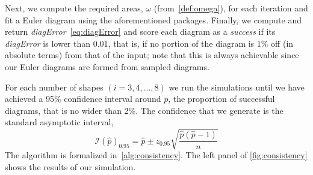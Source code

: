 \documentclass[
  oneside,
  openany,
  numbers=noendperiod,
  parskip=half,
  bibliography=totoc
]{scrbook}\usepackage[]{graphicx}\usepackage{xcolor}
\begin{document}
Next, we compute the required areas, $\omega$ (from~\cref{def:omega}), for each
iteration and fit a Euler diagram using the aforementioned packages. Finally,
we compute and return \emph{diagError}~\eqref{eq:diagError} and score each
diagram as a \emph{success} if its \emph{diagError} is lower than 0.01, that is,
if no portion of the diagram is 1\% off (in absolute terms) from that of the
input; note that this is always achievable since our Euler diagrams are formed
from sampled diagrams.

For each number of shapes $(i=3,4,\dots,8)$ we run the simulations until we have achieved a 95\% confidence interval around $p$, the proportion of successful diagrams, that is no wider than 2\%. The confidence that we generate is the standard asymptotic interval,
\begin{equation*}
\mathcal{I}(\hat{p})_{0.95} = \hat{p} \pm z_{0.95}\sqrt{\frac{\hat{p}(\hat{p}-1)}{n}}
\end{equation*}
The algorithm is formalized in~\autoref{alg:consistency}. The left panel of
\cref{fig:consistency} shows the results of our simulation.

\begin{alg}
\DontPrintSemicolon
{}
\end{alg}
\end{document}
